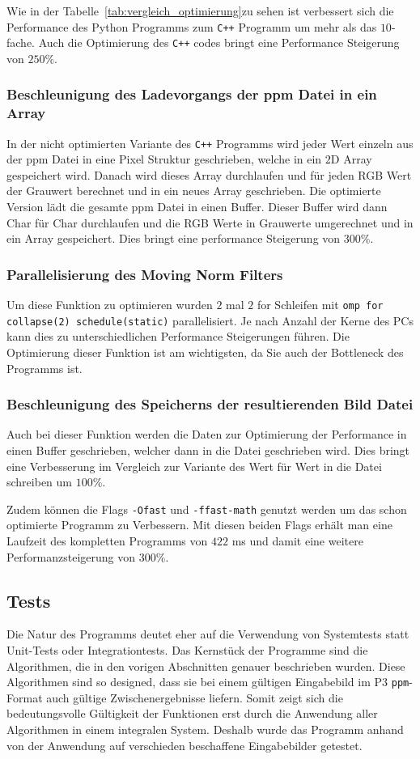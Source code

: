 \documentclass[sigconf]{acmart}
\begin{document}
Wie in der Tabelle~\ref{tab:vergleich_optimierung}zu sehen ist verbessert sich die Performance des
Python Programms zum \texttt{C++} Programm um mehr als das $10$-fache.  Auch die
Optimierung des \texttt{C++} codes bringt eine Performance Steigerung von $250$\%.

\subsubsection{Beschleunigung des Ladevorgangs der ppm Datei in ein Array}
 In der nicht optimierten Variante des \texttt{C++} Programms wird jeder Wert einzeln
aus der ppm Datei in eine Pixel Struktur geschrieben, welche in ein $2$D
Array gespeichert wird. Danach wird dieses Array durchlaufen und für
jeden RGB Wert der Grauwert berechnet und in ein neues Array
geschrieben.  Die optimierte Version lädt die gesamte ppm Datei in
einen Buffer. Dieser Buffer wird dann Char für Char durchlaufen und
die RGB Werte in Grauwerte umgerechnet und in ein Array
gespeichert. Dies bringt eine performance Steigerung von $300$\%.

\subsubsection{Parallelisierung des Moving Norm Filters}
Um diese Funktion zu optimieren wurden $2$ mal $2$ for Schleifen mit \texttt{omp for collapse(2)
schedule(static)} parallelisiert. Je nach Anzahl der Kerne des PCs
kann dies zu unterschiedlichen Performance Steigerungen führen. Die
Optimierung dieser Funktion ist am wichtigsten, da Sie auch der
Bottleneck des Programms ist.

\subsubsection{Beschleunigung des Speicherns der resultierenden Bild Datei}
Auch bei dieser Funktion werden die Daten zur Optimierung der Performance in
einen Buffer geschrieben, welcher dann in die Datei geschrieben wird.
Dies bringt eine Verbesserung im Vergleich zur Variante des Wert für
Wert in die Datei schreiben um $100$\%.

Zudem können die Flags \texttt{-Ofast} und \texttt{-ffast-math} genutzt werden um das
schon optimierte Programm zu Verbessern. Mit diesen beiden Flags
erhält man eine Laufzeit des kompletten Programms von $422$ ms und damit eine weitere
Performanzsteigerung von $300$\%.

\subsection{Tests}
Die Natur des Programms deutet eher auf die Verwendung von Systemtests
statt Unit-Tests oder Integrationtests. Das Kernstück der Programme sind die Algorithmen, 
die in den vorigen Abschnitten genauer beschrieben wurden. Diese Algorithmen sind 
so designed, dass sie bei einem gültigen Eingabebild im P$3$ \texttt{ppm}-Format auch gültige Zwischenergebnisse liefern.
Somit zeigt sich die bedeutungsvolle Gültigkeit der Funktionen erst durch die Anwendung aller Algorithmen
in einem integralen System. Deshalb wurde das Programm anhand von der Anwendung auf
verschieden beschaffene Eingabebilder getestet.
\end{document}
